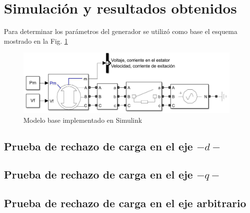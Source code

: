 \documentclass[conference]{IEEEtran}
\begin{document}
\section{Simulación y resultados obtenidos}
Para determinar los parámetros del generador se utilizó como base el esquema mostrado en la Fig. \ref{fig:Modelo_Simulink}

\begin{figure}[H]
    \centering
    \includegraphics[width=\linewidth]{Fig/Modelo_Simulink.pdf}
    \caption{Modelo base implementado en Simulink}
    \label{fig:Modelo_Simulink}
\end{figure}

\subsection{Prueba de rechazo de carga en el eje $-d-$}

\subsection{Prueba de rechazo de carga en el eje $-q-$}

\subsection{Prueba de rechazo de carga en el eje arbitrario}
\end{document}
